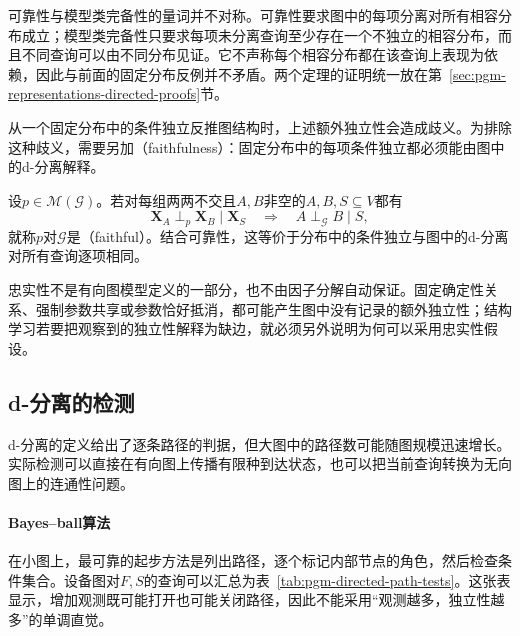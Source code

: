 可靠性与模型类完备性的量词并不对称。可靠性要求图中的每项分离对所有相容分布成立；模型类完备性只要求每项未分离查询至少存在一个不独立的相容分布，而且不同查询可以由不同分布见证。它不声称每个相容分布都在该查询上表现为依赖，因此与前面的固定分布反例并不矛盾。两个定理的证明统一放在第~\ref{sec:pgm-representations-directed-proofs}节。

从一个固定分布中的条件独立反推图结构时，上述额外独立性会造成歧义。为排除这种歧义，需要另加（faithfulness）：固定分布中的每项条件独立都必须能由图中的d-分离解释。

\begin{definition}[忠实性]
  \label{def:pgm-directed-faithfulness}
  设$p\in\mathcal{M}(\mathcal{G})$。若对每组两两不交且$A,B$非空的$A,B,S\subseteq V$都有
  \[
    \bm{X}_A\perp_p\bm{X}_B\mid\bm{X}_S
    \quad\Longrightarrow\quad
    A\perp_{\mathcal{G}}B\mid S,
  \]
  就称$p$对$\mathcal{G}$是（faithful）。结合可靠性，这等价于分布中的条件独立与图中的d-分离对所有查询逐项相同。
\end{definition}

忠实性不是有向图模型定义的一部分，也不由因子分解自动保证。固定确定性关系、强制参数共享或参数恰好抵消，都可能产生图中没有记录的额外独立性；结构学习若要把观察到的独立性解释为缺边，就必须另外说明为何可以采用忠实性假设。

\subsection{d-分离的检测}
\label{sec:pgm-directed-d-separation-testing}

d-分离的定义给出了逐条路径的判据，但大图中的路径数可能随图规模迅速增长。实际检测可以直接在有向图上传播有限种到达状态，也可以把当前查询转换为无向图上的连通性问题。

\begingroup
\let\subsubsection\paragraph

\subsubsection{Bayes--ball算法}
\label{sec:pgm-directed-bayes-ball}

在小图上，最可靠的起步方法是列出路径，逐个标记内部节点的角色，然后检查条件集合。设备图对$F,S$的查询可以汇总为表~\ref{tab:pgm-directed-path-tests}。这张表显示，增加观测既可能打开也可能关闭路径，因此不能采用“观测越多，独立性越多”的单调直觉。

